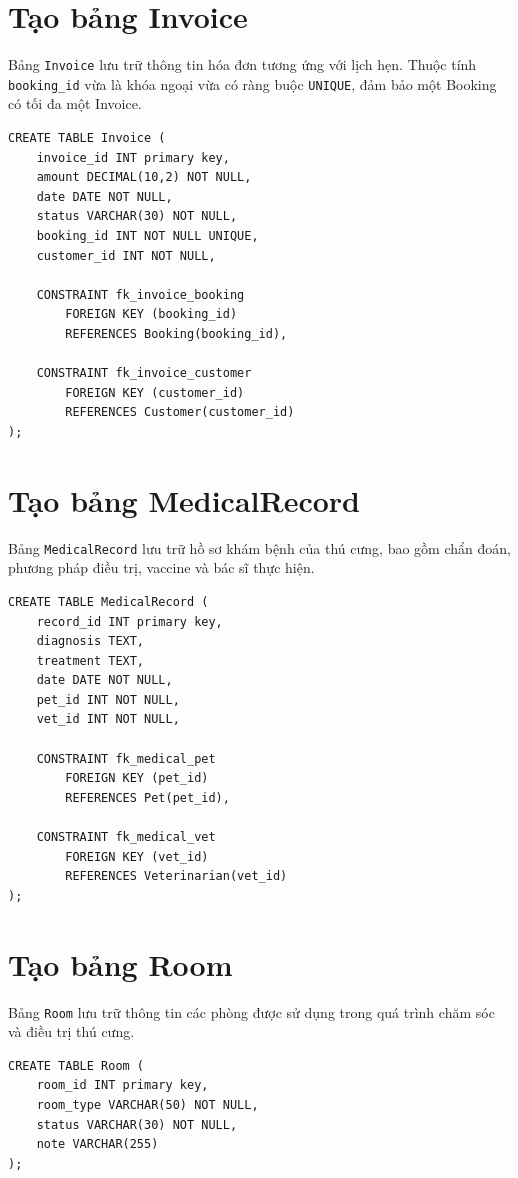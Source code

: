 \section{Tạo bảng Invoice}
Bảng \texttt{Invoice} lưu trữ thông tin hóa đơn tương ứng với lịch hẹn. Thuộc tính \texttt{booking\_id} vừa là khóa ngoại vừa có ràng buộc \texttt{UNIQUE}, đảm bảo một Booking có tối đa một Invoice.

\begin{verbatim}
CREATE TABLE Invoice (
    invoice_id INT primary key,
    amount DECIMAL(10,2) NOT NULL,
    date DATE NOT NULL,
    status VARCHAR(30) NOT NULL,
    booking_id INT NOT NULL UNIQUE,
    customer_id INT NOT NULL,

    CONSTRAINT fk_invoice_booking
        FOREIGN KEY (booking_id)
        REFERENCES Booking(booking_id),

    CONSTRAINT fk_invoice_customer
        FOREIGN KEY (customer_id)
        REFERENCES Customer(customer_id)
);
\end{verbatim}

\section{Tạo bảng MedicalRecord}
Bảng \texttt{MedicalRecord} lưu trữ hồ sơ khám bệnh của thú cưng, bao gồm chẩn đoán, phương pháp điều trị, vaccine và bác sĩ thực hiện.

\begin{verbatim}
CREATE TABLE MedicalRecord (
    record_id INT primary key,
    diagnosis TEXT,
    treatment TEXT,
    date DATE NOT NULL,
    pet_id INT NOT NULL,
    vet_id INT NOT NULL,

    CONSTRAINT fk_medical_pet
        FOREIGN KEY (pet_id)
        REFERENCES Pet(pet_id),

    CONSTRAINT fk_medical_vet
        FOREIGN KEY (vet_id)
        REFERENCES Veterinarian(vet_id)
);
\end{verbatim}

\section{Tạo bảng Room}
Bảng \texttt{Room} lưu trữ thông tin các phòng được sử dụng trong quá trình chăm sóc và điều trị thú cưng.

\begin{verbatim}
CREATE TABLE Room (
    room_id INT primary key,
    room_type VARCHAR(50) NOT NULL,
    status VARCHAR(30) NOT NULL,
    note VARCHAR(255)
);
\end{verbatim}

